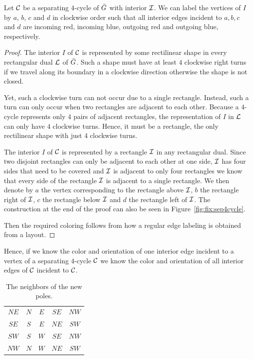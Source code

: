   \begin{lemma}
    \label{lm:fix:fourCycleInteriorColor}
    Let $\mathcal{C}$ be a separating $4$-cycle of $\bar{G}$ with interior $\mathcal{I}$. We can label the vertices of $I$ by $a$, $b$, $c$ and $d$ in clockwise order such that all interior edges incident to $a, b, c$ and $d$ are incoming red, incoming blue, outgoing red and outgoing blue, respectively.
  \end{lemma}
  \begin{proof}
    The interior $I$ of $\mathcal{C}$ is represented by some rectilinear shape in every rectangular dual $\mathcal{L}$ of $\bar{G}$. Such a shape must have at least $4$ clockwise right turns if we travel along its boundary in a clockwise direction otherwise the shape is not closed.

    Yet, such a clockwise turn can not occur due to a single rectangle. Instead, such a turn can only occur when two rectangles are adjacent to each other. Because a $4$-cycle represents only $4$ pairs of adjacent rectangles, the representation of $I$ in $\mathcal{L}$ can only have $4$ clockwise turns. Hence, it must be a rectangle, the only rectilinear shape with just $4$ clockwise turns.

    The interior $I$ of $\mathcal{C}$ is represented by a rectangle $\mathcal{I}$ in any rectangular dual. Since two disjoint rectangles can only be adjacent to each other at one side, $\mathcal{I}$ has four sides that need to be covered and $\mathcal{I}$ is adjacent to only four rectangles we know that every side of the rectangle $\mathcal{I}$ is adjacent to a single rectangle. We then denote by $a$ the vertex corresponding to the rectangle above $\mathcal{I}$, $b$ the rectangle right of $\mathcal{I}$, $c$ the rectangle below $\mathcal{I}$ and $d$ the rectangle left of $\mathcal{I}$.
    The construction at the end of the proof can also be seen in Figure~\ref{fig:fix:sep4cycle}.

    Then the required coloring follows from how a regular edge labeling is obtained from a layout.
  \end{proof}

  Hence, if we know the color and orientation of one interior edge incident to a vertex of a separating $4$-cycle $\mathcal{C}$ we know the color and orientation of all interior edges of $\mathcal{C}$ incident to $\mathcal{C}$.

  \begin{table}
    \centering
    \begin{tabular}{c|| c c c c}
      $NE$ & $N$ & $ E$ & $ SE$ & $ NW$ \\
      $SE$ & $S$ & $ E$ & $ NE$ & $ SW$\\
      $SW$ & $S$ & $ W$ & $ SE$ & $ NW$\\
      $NW$ & $N$ & $ W$ & $ NE$ & $ SW$\\
    \end{tabular}
    \caption{The neighbors of the new poles.}
    \label{tab:scaffold}
  \end{table}

